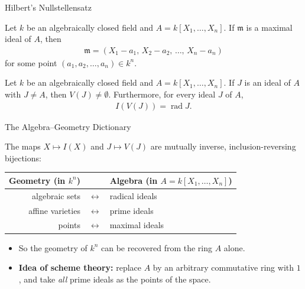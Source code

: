 \documentclass[10pt,aspectratio=1610]{beamer}
\DeclareMathOperator{\rad}{rad}
\newcommand{\mm}{\mathfrak{m}}
\begin{document}
    \begin{frame}{Hilbert's Nullstellensatz}
        \begin{theorem}
            Let $k$ be an algebraically closed field and $A = k[X_1, \ldots, X_n]$. If $\mm$ is a maximal ideal of $A$, then
            \begin{align*}
                \mm = (X_1 - a_1,\, X_2 - a_2,\, \ldots,\, X_n-a_n)
            \end{align*}
            for some point $(a_1, a_2, \ldots, a_n) \in k^n$.
        \end{theorem}

        \begin{theorem}
            Let $k$ be an algebraically closed field and $A = k[X_1, \ldots, X_n]$. If $J$ is an ideal of $A$ with $J \neq A$, then $V(J) \neq \emptyset$. Furthermore, for every ideal $J$ of $A$,
            \begin{align*}
                I(V(J)) = \rad J.
            \end{align*}
        \end{theorem}
    \end{frame}

    \begin{frame}{The Algebra--Geometry Dictionary}
        \begin{corollary}
            The maps $X \mapsto I(X)$ and $J \mapsto V(J)$ are mutually inverse, inclusion-reversing bijections:
            \begin{center}
                \upshape
                \begin{tabular}{rcl}
                    \toprule
                    \textbf{Geometry} (in $k^n$) & & \textbf{Algebra} (in $A = k[X_1,\ldots,X_n]$) \\
                    \midrule
                    algebraic sets & $\longleftrightarrow$ & radical ideals \\
                    affine varieties & $\longleftrightarrow$ & prime ideals \\
                    points & $\longleftrightarrow$ & maximal ideals \\
                    \bottomrule
                \end{tabular}
            \end{center}
        \end{corollary}
        \begin{itemize}
            \item So the geometry of $k^n$ can be recovered from the ring $A$ alone.
            \item \textbf{Idea of scheme theory:} replace $A$ by an arbitrary commutative ring with $1$, and take \emph{all} prime ideals as the points of the space.
        \end{itemize}
    \end{frame}
\end{document}
